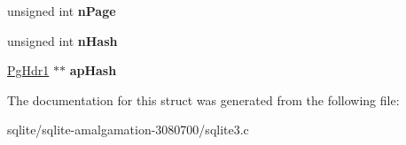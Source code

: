 \begin{DoxyCompactItemize}
\item 
\hypertarget{struct_p_cache1_ace332c276e28352992529f60f0ac457c}{unsigned int {\bfseries n\+Page}}\label{struct_p_cache1_ace332c276e28352992529f60f0ac457c}

\item 
\hypertarget{struct_p_cache1_a09d9488a8a3a52822e33dd43e14c69e1}{unsigned int {\bfseries n\+Hash}}\label{struct_p_cache1_a09d9488a8a3a52822e33dd43e14c69e1}

\item 
\hypertarget{struct_p_cache1_a1169ec7ba2a628d89841d16ced651e1f}{\hyperlink{struct_pg_hdr1}{Pg\+Hdr1} $\ast$$\ast$ {\bfseries ap\+Hash}}\label{struct_p_cache1_a1169ec7ba2a628d89841d16ced651e1f}

\end{DoxyCompactItemize}


The documentation for this struct was generated from the following file\+:\begin{DoxyCompactItemize}
\item 
sqlite/sqlite-\/amalgamation-\/3080700/sqlite3.\+c\end{DoxyCompactItemize}
